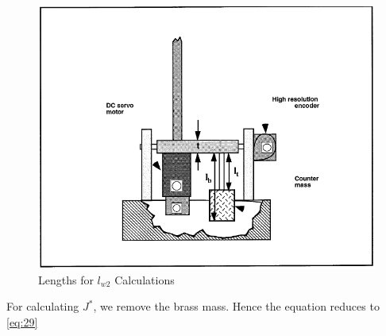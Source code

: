 \documentclass[12pt, a4paper]{article}
\begin{document}
\begin{figure}[H]
\centering
\includegraphics[width = \textwidth]{lw2.png}
\caption{Lengths for $l_{w2}$ Calculations}
\label{Fig5}
\end{figure}
For calculating $J^*$, we remove the brass mass. Hence the equation reduces to \eqref{eq:29}
\end{document}
